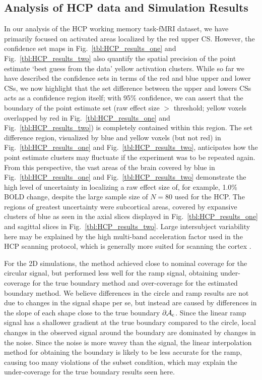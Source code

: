 \subsection{Analysis of HCP data and Simulation Results}
\label{sec:discussion_HCP_simultations}
In our analysis of the HCP working memory task-fMRI dataset, we have primarily focused on activated areas localized by the red upper CS. However, the confidence set maps in Fig.\ \ref{tbl:HCP_results_one} and Fig.\ \ref{tbl:HCP_results_two} also quantify the spatial precision of the point estimate `best guess from the data' yellow activation clusters. While so far we have described the confidence sets in terms of the red and blue upper and lower CSs, we now highlight that the set difference between the upper and lowers CSs acts as a confidence region itself; with 95\% confidence, we can assert that the boundary of the point estimate set (raw effect size $>$ threshold; yellow voxels overlapped by red in Fig.\ \ref{tbl:HCP_results_one} and Fig.\ \ref{tbl:HCP_results_two}) is completely contained within this region. The set difference region, visualized by blue and yellow voxels (but not red) in Fig.\ \ref{tbl:HCP_results_one} and Fig.\ \ref{tbl:HCP_results_two}, anticipates how the point estimate clusters may fluctuate if the experiment was to be repeated again. From this perspective, the vast areas of the brain covered by blue in Fig.\ \ref{tbl:HCP_results_one} and Fig.\ \ref{tbl:HCP_results_two} demonstrate the high level of uncertainty in localizing a raw effect size of, for example, 1.0\% BOLD change, despite the large sample size of $N = 80$ used for the HCP. The regions of greatest uncertainty were subcortical areas, covered by expansive clusters of blue as seen in the axial slices displayed in Fig.\ \ref{tbl:HCP_results_one} and sagittal slices in Fig.\ \ref{tbl:HCP_results_two}. Large intersubject variability here may be explained by the high multi-band acceleration factor used in the HCP scanning protocol, which is generally more suited for scanning the cortex \citep{Smith2013-ul}. 

For the 2D simulations, the method achieved close to nominal coverage for the circular signal, but performed less well for the ramp signal, obtaining under-coverage for the true boundary method and over-coverage for the estimated boundary method. We believe differences in the circle and ramp results are not due to changes in the signal shape per se, but instead are caused by differences in the slope of each shape close to the true boundary $\operatorname{\partial\mathcal{A}_{c}}$. Since the linear ramp signal has a shallower gradient at the true boundary compared to the circle, local changes in the observed signal around the boundary are dominated by changes in the noise. Since the noise is more wavey than the signal, the linear interpolation method for obtaining the boundary is likely to be less accurate for the ramp, causing too many violations of the subset condition, which may explain the under-coverage for the true boundary results seen here.


